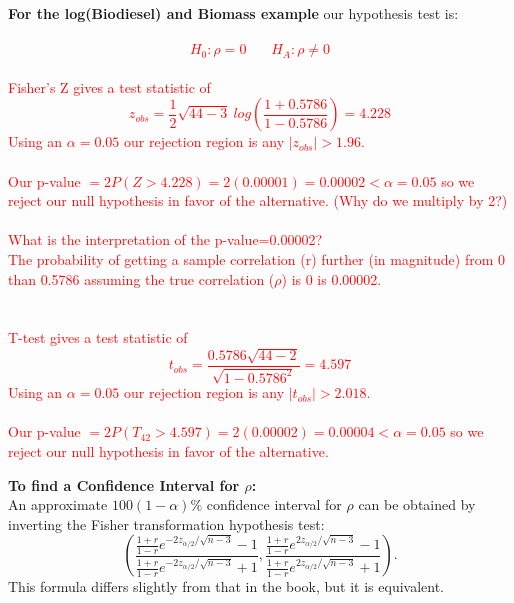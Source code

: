 \textbf{For the log(Biodiesel) and Biomass example} our hypothesis test is:\\~\\
\textcolor{red}{
$$H_0:\rho=0 ~~~~~~~~H_A: \rho\neq 0$$~\\
Fisher's Z gives a test statistic of 
$$z_{obs}=\frac{1}{2}\sqrt{44-3}~log\left(\frac{1+0.5786}{1-0.5786}\right)=4.228$$
Using an $\alpha=0.05$ our rejection region is any $|z_{obs}|>1.96$.\\~\\
Our p-value $=2P(Z>4.228) = 2(0.00001) = 0.00002 < \alpha = 0.05$ so we reject our null hypothesis in favor of the alternative.  (Why do we multiply by 2?)\\~\\
What is the interpretation of the p-value=0.00002?  \\
The probability of getting a sample correlation (r) further (in magnitude) from 0 than 0.5786 assuming the true correlation ($\rho$) is 0 is 0.00002.\\~\\~\\
T-test gives a test statistic of 
$$t_{obs}=\frac{0.5786\sqrt{44-2}}{\sqrt{1-0.5786^2}}=4.597$$
Using an $\alpha=0.05$ our rejection region is any $|t_{obs}|>2.018$.\\~\\
Our p-value $=2P(T_{42}>4.597) = 2(0.00002) = 0.00004 < \alpha = 0.05$ so we reject our null hypothesis in favor of the alternative.
}

\newpage

\Large\textbf{To find a Confidence Interval for $\rho$:}\large\\
An approximate $100(1-\alpha)\%$ confidence interval for $\rho$ can be obtained by inverting the {Fisher transformation hypothesis test}:
$$ \left(\frac{\frac{1+r}{1-r}e^{-2z_{\alpha/2}/\sqrt{n-3}}-1}{\frac{1+r}{1-r}e^{-2z_{\alpha/2}/\sqrt{n-3}}+1}, \frac{\frac{1+r}{1-r}e^{2z_{\alpha/2}/\sqrt{n-3}}-1}{\frac{1+r}{1-r}e^{2z_{\alpha/2}/\sqrt{n-3}}+1}\right).$$
This formula differs slightly from that in the book, but it is equivalent.\\~\\~\\


